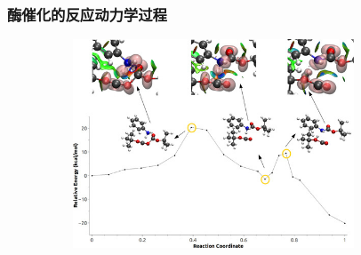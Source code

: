 \frame
{
	\frametitle{酶催化的反应动力学过程}
\begin{figure}[h!]
\centering
\vspace{-5.5pt}
\includegraphics[height=2.45in,width=4.00in,viewport=0 0 180 135,clip]{Figures/molecules-reaction-path.jpg}
\label{enzyem-reaction-path-2}
\end{figure}
}

%
